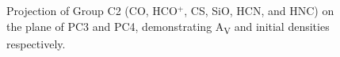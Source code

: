 \documentclass{aa}
\begin{document}
\begin{CJK*}{UTF8}{gbsn}
    \begin{figure}[htbp]
        \centering
        \caption{Projection of Group C2 (CO, HCO$^+$, CS, SiO, HCN, and HNC) on the plane of PC3 and PC4, demonstrating A\textsubscript{V} and initial densities respectively.}
        \label{C2-34}
    \end{figure}


\end{CJK*}
\end{document}
